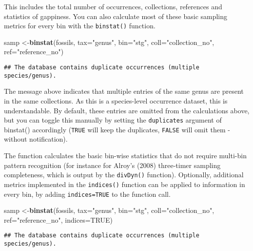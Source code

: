 \documentclass[]{article}
\newenvironment{Shaded}{\begin{snugshade}}{\end{snugshade}}
\newcommand{\KeywordTok}[1]{\textcolor[rgb]{0.13,0.29,0.53}{\textbf{{#1}}}}
\newcommand{\DataTypeTok}[1]{\textcolor[rgb]{0.13,0.29,0.53}{{#1}}}
\newcommand{\StringTok}[1]{\textcolor[rgb]{0.31,0.60,0.02}{{#1}}}
\newcommand{\OtherTok}[1]{\textcolor[rgb]{0.56,0.35,0.01}{{#1}}}
\newcommand{\NormalTok}[1]{{#1}}
\begin{document}
This includes the total number of occurrences, collections, references
and statistics of gappiness. You can also calculate most of these basic
sampling metrics for every bin with the \texttt{binstat()} function.

\begin{Shaded}
\begin{Highlighting}[]
\NormalTok{samp <-}\KeywordTok{binstat}\NormalTok{(fossils, }\DataTypeTok{tax=}\StringTok{"genus"}\NormalTok{, }\DataTypeTok{bin=}\StringTok{"stg"}\NormalTok{, }
  \DataTypeTok{coll=}\StringTok{"collection_no"}\NormalTok{, }\DataTypeTok{ref=}\StringTok{"reference_no"}\NormalTok{)}
\end{Highlighting}
\end{Shaded}

\begin{verbatim}
## The database contains duplicate occurrences (multiple species/genus).
\end{verbatim}

The message above indicates that multiple entries of the same genus are
present in the same collections. As this is a species-level occurrence
dataset, this is understandable. By default, these entries are omitted
from the calculations above, but you can toggle this manually by setting
the \texttt{duplicates} argument of binstat() accordingly (\texttt{TRUE}
will keep the duplicates, \texttt{FALSE} will omit them - without
notification).

The function calculates the basic bin-wise statistics that do not
require multi-bin pattern recognition (for instance for Alroy's (2008)
three-timer sampling completeness, which is output by the
\texttt{divDyn()} function). Optionally, additional metrics implemented
in the \texttt{indices()} function can be applied to information in
every bin, by adding \texttt{indices=TRUE} to the function call.

\begin{Shaded}
\begin{Highlighting}[]
\NormalTok{samp <-}\KeywordTok{binstat}\NormalTok{(fossils, }\DataTypeTok{tax=}\StringTok{"genus"}\NormalTok{, }\DataTypeTok{bin=}\StringTok{"stg"}\NormalTok{, }
  \DataTypeTok{coll=}\StringTok{"collection_no"}\NormalTok{, }\DataTypeTok{ref=}\StringTok{"reference_no"}\NormalTok{, }\DataTypeTok{indices=}\OtherTok{TRUE}\NormalTok{)}
\end{Highlighting}
\end{Shaded}

\begin{verbatim}
## The database contains duplicate occurrences (multiple species/genus).
\end{verbatim}
\end{document}
